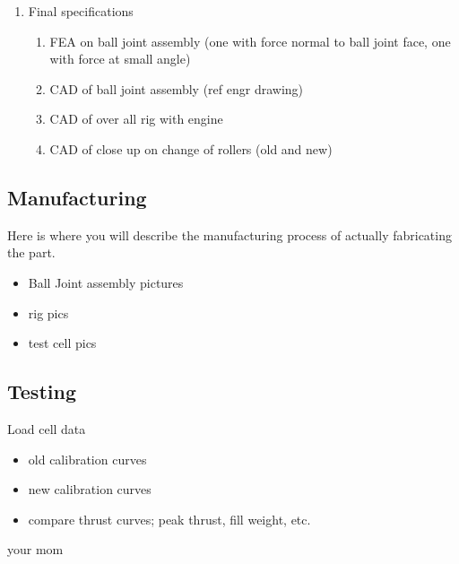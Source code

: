 \documentclass[10pt,a4paper]{article}
\begin{document}
\begin{enumerate}
 	
 	
 	\item Final specifications
 	\begin{enumerate}
 		\item FEA on ball joint assembly (one with force normal to ball joint face, one with force at small angle)
 		\item CAD of ball joint assembly (ref engr drawing)
 		\item CAD of over all rig with engine
 		\item CAD of close up on change of rollers (old and new)
 	\end{enumerate}
 \end{enumerate}

\newpage
\subsection{Manufacturing}

Here is where you will describe the manufacturing process of actually fabricating the part.
\begin{itemize}
	\item Ball Joint assembly pictures
	\item rig pics
	\item test cell pics 
\end{itemize}

\subsection{Testing}

Load cell data
\begin{itemize}
	\item old calibration curves
	\item new calibration curves
	\item compare thrust curves; peak thrust, fill weight, etc.
\end{itemize}


\begin{thebibliography}{10}
	
	your mom
	
\end{thebibliography}
\end{document}
